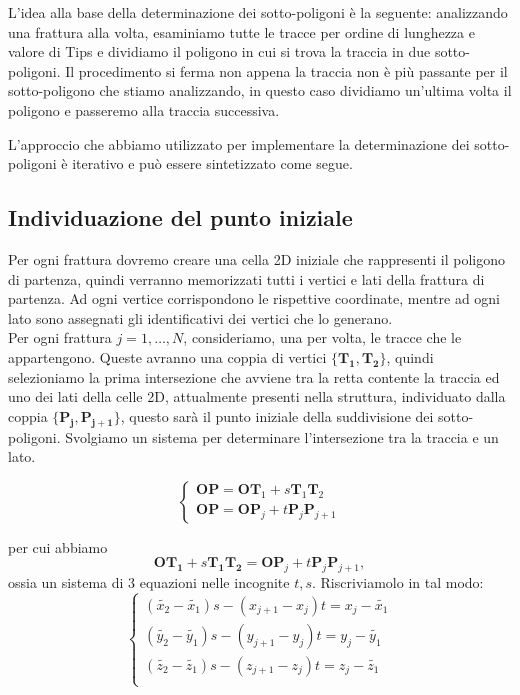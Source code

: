 \documentclass[a4paper]{article}
\newcommand{\B}{\mathbf}
\begin{document}
L'idea alla base della determinazione dei sotto-poligoni è la seguente: analizzando una frattura alla volta, esaminiamo tutte le tracce per ordine di lunghezza e valore di Tips e dividiamo il poligono in cui si trova la traccia in due sotto-poligoni. Il procedimento si ferma non appena la traccia non è più passante per il sotto-poligono che stiamo analizzando, in questo caso dividiamo un'ultima volta il poligono e passeremo alla traccia successiva. 

L'approccio che abbiamo utilizzato per implementare la determinazione dei sotto-poligoni è iterativo e può essere sintetizzato come segue.  

\subsection{Individuazione del punto iniziale}

Per ogni frattura dovremo creare una cella 2D iniziale che rappresenti il poligono di partenza, quindi verranno memorizzati tutti i vertici e lati della frattura di partenza. Ad ogni vertice corrispondono le rispettive coordinate, mentre ad ogni lato sono assegnati gli identificativi dei vertici che lo generano. \\ [1mm]

Per ogni frattura $j=1,\dots,N$, consideriamo, una per volta, le tracce che le appartengono. Queste avranno una coppia di vertici $\{\B{T_{1}},\B{T_{2}}\}$, quindi selezioniamo la prima intersezione che avviene tra la retta contente la traccia ed uno dei lati della celle 2D, attualmente presenti nella struttura, individuato dalla coppia $\{\B{P_{j}},\B{P_{j+1}}\}$, questo sarà il punto iniziale della suddivisione dei sotto-poligoni. Svolgiamo un sistema per determinare l'intersezione tra la traccia e un lato.

\begin{equation}
\begin{cases}
\B{OP}=\B{OT}_1+s\B{T}_1\B{T}_{2} \\ 
\B{OP}=\B{OP}_j+t\B{P}_j\B{P}_{j+1}
\end{cases}
\label{eq:intersezioni}
\end{equation}

per cui abbiamo $$\B{OT_{1}}+s\B{T_{1}T_{2}}=\B{OP}_j+t\B{P}_j\B{P}_{j+1},$$ ossia un sistema di $3$ equazioni nelle incognite $t,s$. Riscriviamolo in tal modo:
\begin{equation} \label{sis:parametri}
\begin{cases}
(\tilde{x_{2}}-\tilde{x_1})s-(x_{j+1}-x_j)t=x_j-\tilde{x_1} \\
(\tilde{y_{2}}-\tilde{y_1})s-(y_{j+1}-y_j)t=y_j-\tilde{y_1} \\
(\tilde{z_{2}}-\tilde{z_1})s-(z_{j+1}-z_j)t=z_j-\tilde{z_1} \\
\end{cases}
\end{equation}
\end{document}
